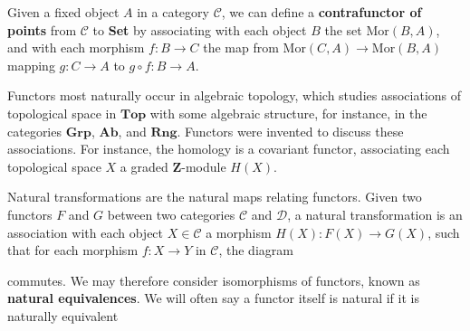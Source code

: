\begin{example}
    Given a fixed object $A$ in a category $\mathcal{C}$, we can define a {\bf contrafunctor of points} from $\mathcal{C}$ to {\bf Set} by associating with each object $B$ the set $\text{Mor}(B,A)$, and with each morphism $f: B \to C$ the map from $\text{Mor}(C,A) \to \text{Mor}(B,A)$ mapping $g: C \to A$ to $g \circ f: B \to A$. 
\end{example}

\begin{example}
    Functors most naturally occur in algebraic topology, which studies associations of topological space in $\mathbf{Top}$ with some algebraic structure, for instance, in the categories $\mathbf{Grp}$, $\mathbf{Ab}$, and $\mathbf{Rng}$. Functors were invented to discuss these associations. For instance, the homology is a covariant functor, associating each topological space $X$ a graded $\mathbf{Z}$-module $H(X)$.
\end{example}

Natural transformations are the natural maps relating functors. Given two functors $F$ and $G$ between two categories $\mathcal{C}$ and $\mathcal{D}$, a natural transformation is an association with each object $X \in \mathcal{C}$ a morphism $H(X): F(X) \to G(X)$, such that for each morphism $f: X \to Y$ in $\mathcal{C}$, the diagram
%
\begin{center}
\end{center}
%
commutes. We may therefore consider isomorphisms of functors, known as {\bf natural equivalences}. We will often say a functor itself is natural if it is naturally equivalent 


